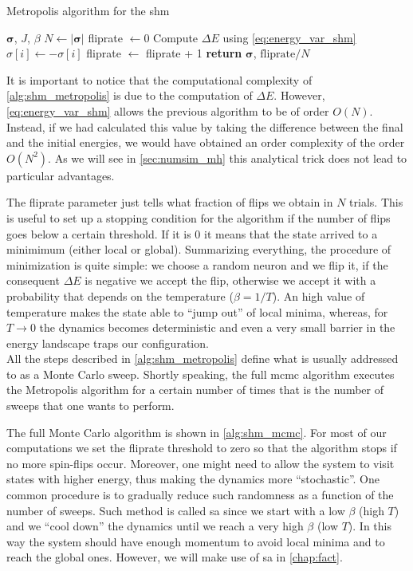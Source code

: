 \documentclass[\rootdir/main.tex]{subfiles}
\begin{document}
\begin{algorithm}
    \caption{Metropolis algorithm for the \acrlong{shm}}
    \label{alg:shm_metropolis}
    \begin{algorithmic}[1]
    \Require $\symbf{\sigma}$, $J$, $\beta$
        \State $N \gets |\symbf{\sigma}|$ 
        \State fliprate $\gets 0$
        \State Compute $\Delta E$ using \cref{eq:energy_var_shm}
            \State $\sigma[i] \gets - \sigma[i]$
            \State fliprate $\gets$ fliprate + 1
        \EndIf
        \EndFor
    \State \textbf{return} $\symbf{\sigma}$, $\text{fliprate} / N$
    \end{algorithmic}
\end{algorithm}

It is important to notice that the computational complexity of \cref{alg:shm_metropolis} is due to the computation of $\Delta E$. However, \cref{eq:energy_var_shm} allows the previous algorithm to be of order $O(N)$. Instead, if we had calculated this value by taking the difference between the final and the initial energies, we would have obtained an order complexity of the order $O(N^2)$. As we will see in \cref{sec:numsim_mh} this analytical trick does not lead to particular advantages.

The fliprate parameter just tells what fraction of flips we obtain in $N$ trials. This is useful to set up a stopping condition for the algorithm if the number of flips goes below a certain threshold. If it is $0$ it means that the state arrived to a minimimum (either local or global).
Summarizing everything, the procedure of minimization is quite simple: we choose a random neuron and we flip it, if the consequent $\Delta E$ is negative we accept the flip, otherwise we accept it with a probability that depends on the temperature ($\beta = 1/ T$). An high value of temperature makes the state able to ``jump out'' of local minima, whereas, for $T \to 0$ the dynamics becomes deterministic and even a very small barrier in the energy landscape traps our configuration.\\
All the steps described in \cref{alg:shm_metropolis} define what is usually addressed to as a Monte Carlo sweep. Shortly speaking, the full \acrlong{mcmc} algorithm executes the Metropolis algorithm for a certain number of times that is the number of sweeps that one wants to perform.

The full Monte Carlo algorithm is shown in \cref{alg:shm_mcmc}. For most of our computations we set the fliprate threshold to zero so that the algorithm stops if no more spin-flips occur. Moreover, one might need to allow the system to visit states with higher energy, thus making the dynamics more ``stochastic''. One common procedure is to gradually reduce such randomness as a function of the number of sweeps. Such method is called \acrfull{sa} since we start with a low $\beta$ (high $T$) and we ``cool down'' the dynamics until we reach a very high $\beta$ (low $T$). In this way the system should have enough momentum to avoid local minima and to reach the global ones. However, we will make use of \acrlong{sa} in \cref{chap:fact}.
\end{document}

